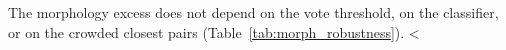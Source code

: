 \documentclass{aa}
\newcommand{\CB}{Control\textsubscript{4B}}
\newcommand{\CC}{Control\textsubscript{4C}}
\newcommand{\CG}{CG\textsubscript{4}}
\newcommand{\RG}{RG\textsubscript{4}}
\begin{document}
The morphology excess does not depend on the vote threshold, on the classifier, or on the crowded closest pairs (Table~\ref{tab:morph_robustness}). <%
\end{document}
